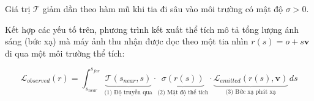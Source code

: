 Giá trị $\mathcal{T}$ giảm dần theo hàm mũ khi tia đi sâu vào môi trường có mật độ $\sigma > 0$.

Kết hợp các yếu tố trên, phương trình kết xuất thể tích mô tả tổng lượng ánh sáng (bức xạ) mà máy ảnh thu nhận được dọc theo một tia nhìn $r(s) = o + s\mathbf{v}$ đi qua một môi trường thể tích:

\begin{equation} \label{eq:volume_integral_detailed}
    \mathcal{L}_{observed}(r) = \int_{s_{near}}^{s_{far}} \underbrace{\mathcal{T}(s_{near}, s)}_{\text{(1) Độ truyền qua}} \cdot \underbrace{\sigma(r(s))}_{\text{(2) Mật độ thể tích}} \cdot \underbrace{\mathcal{L}_{emitted}(r(s), \mathbf{v})}_{\text{(3) Bức xạ phát xạ}} \, ds
\end{equation}